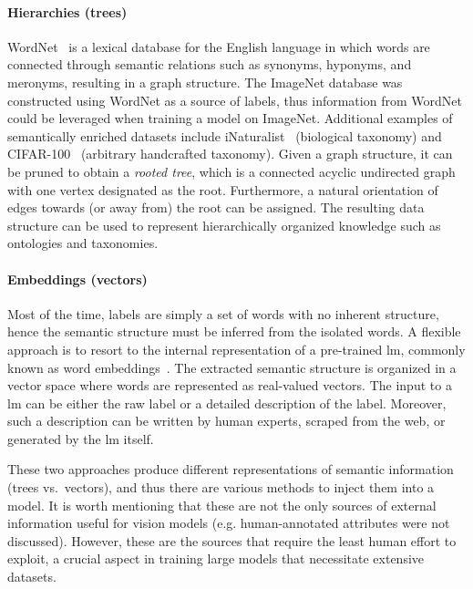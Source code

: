 \paragraph{Hierarchies (trees)}
\label{par:hierarchies-tree}
WordNet~\cite{WordnetMi1995} is a lexical database for the English language in which words are connected through semantic relations such as synonyms, hyponyms, and meronyms, resulting in a graph structure. The ImageNet database was constructed using WordNet as a source of labels, thus information from WordNet could be leveraged when training a model on ImageNet. Additional examples of semantically enriched datasets include iNaturalist~\cite{TheInaturalistHorn2017} (biological taxonomy) and CIFAR-100~\cite{LearningMultipKrizhe2009} (arbitrary handcrafted taxonomy). Given a graph structure, it can be pruned to obtain a \emph{rooted tree}, which is a connected acyclic undirected graph with one vertex designated as the root. Furthermore, a natural orientation of edges towards (or away from) the root can be assigned. The resulting data structure can be used to represent hierarchically organized knowledge such as ontologies and taxonomies.

\paragraph{Embeddings (vectors)}
\label{par:embeddings-vectors}
Most of the time, labels are simply a set of words with no inherent structure, hence the semantic structure must be inferred from the isolated words. A flexible approach is to resort to the internal representation of a pre-trained \acrfull{lm}, commonly known as word embeddings~\cite{BeyondWordEmbIncitt2023}. The extracted semantic structure is organized in a vector space where words are represented as real-valued vectors. The input to a \acrshort{lm} can be either the raw label or a detailed description of the label. Moreover, such a description can be written by human experts, scraped from the web, or generated by the \acrshort{lm} itself.\medskip

These two approaches produce different representations of semantic information (trees vs.\ vectors), and thus there are various methods to inject them into a model.
It is worth mentioning that these are not the only sources of external information useful for vision models (e.g. human-annotated attributes were not discussed). However, these are the sources that require the least human effort to exploit, a crucial aspect in training large models that necessitate extensive datasets.

